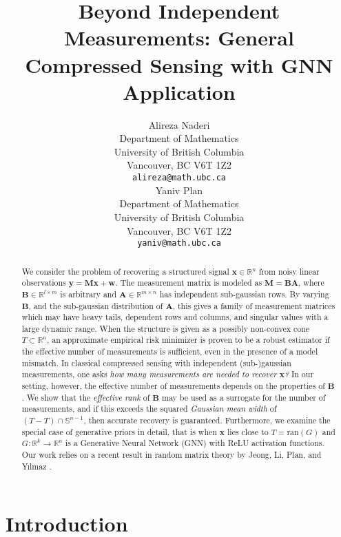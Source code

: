 \documentclass{article}
\title{Beyond Independent Measurements: General Compressed Sensing with GNN Application}
\author{
  Alireza Naderi \\
  Department of Mathematics\\
  University of British Columbia\\
  Vancouver, BC V6T 1Z2 \\
  \texttt{alireza@math.ubc.ca} \\
   \And
   Yaniv Plan \\
   Department of Mathematics \\
   University of British Columbia \\
   Vancouver, BC V6T 1Z2 \\
   \texttt{yaniv@math.ubc.ca} \\
}
\begin{document}
\maketitle

\begin{abstract}
We consider the problem of recovering a structured signal $\mathbf{x} \in \mathbb{R}^{n}$ from noisy linear observations $\mathbf{y} =\mathbf{M} \mathbf{x}+\mathbf{w}$. The measurement matrix is modeled as $\mathbf{M} = \mathbf{B}\mathbf{A}$, where $\mathbf{B} \in \mathbb{R}^{l \times m}$ is arbitrary and $\mathbf{A} \in \mathbb{R}^{m \times n}$ has independent sub-gaussian rows. By varying $\mathbf{B}$, and the sub-gaussian distribution of $\mathbf{A}$, this gives a family of measurement matrices which may have heavy tails, dependent rows and columns, and singular values with a large dynamic range. When the structure is given as a possibly non-convex cone $T \subset \mathbb{R}^{n}$, an approximate empirical risk minimizer is proven to be a robust estimator if the effective number of measurements is sufficient, even in the presence of a model mismatch. In classical compressed sensing with independent (sub-)gaussian measurements, one asks \textit{how many measurements are needed to recover $\mathbf{x}$?} In our setting, however, the effective number of measurements depends on the properties of $\mathbf{B}$. We show that the \textit{effective rank} of $\mathbf{B}$ may be used as a surrogate for the number of measurements, and if this exceeds the squared \textit{Gaussian mean width} of $(T-T) \cap \mathbb{S}^{n-1}$, then accurate recovery is guaranteed. Furthermore, we examine the special case of generative priors in detail, that is when $\mathbf{x}$ lies close to $T = \mathrm{ran}(G)$ and $G: \mathbb{R}^k \rightarrow \mathbb{R}^n$ is a Generative Neural Network (GNN) with ReLU activation functions.  Our work relies on a recent result in random matrix theory by Jeong, Li, Plan, and Y{\i}lmaz \cite{jeong2020subgaussian}.
\end{abstract}

\section{Introduction} \label{intro}
\par
\end{document}

